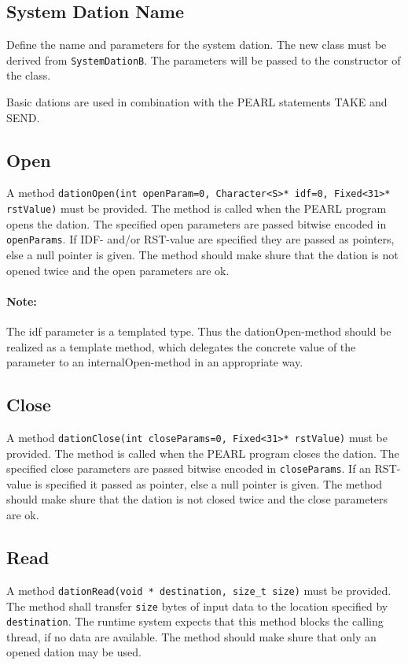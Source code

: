 \subsection{System Dation Name}
Define the name and parameters for the system dation.
The new class must be derived from \verb|SystemDationB|.
The parameters will be passed to the constructor of the class.

Basic dations are used in combination with the PEARL statements TAKE and
SEND.

\subsection{Open}
A method \verb|dationOpen(int openParam=0, Character<S>* idf=0, Fixed<31>* rstValue)|
must be provided.
The method is called when the PEARL program opens the dation.
The specified open parameters are passed bitwise encoded in \verb|openParams|.
If IDF- and/or RST-value are specified they are passed as pointers, else
a null pointer is given.
The method should make shure that the dation is not opened twice and
the open parameters are ok.

\paragraph{Note:} The idf parameter is a templated type.
 Thus the dationOpen-method should be realized as a template method,
 which delegates the concrete value of the parameter to an
 internalOpen-method in an appropriate way.

\subsection{Close}
A method \verb|dationClose(int closeParams=0, Fixed<31>* rstValue)|
must be provided.
The method is called when the PEARL program closes the dation.
The specified close parameters are passed bitwise encoded in \verb|closeParams|.
If an RST-value is specified it passed as pointer, else
a null pointer is given.
The method should make shure that the dation is not closed twice and
the close parameters are ok.

\subsection{Read}
A method \verb|dationRead(void * destination, size_t size)|
must be provided. The method shall transfer \verb|size| bytes of
input data to the location specified by \verb|destination|.
The runtime system expects that this method blocks the calling thread,
if no data are available.
The method should make shure that only an opened dation may be used.


